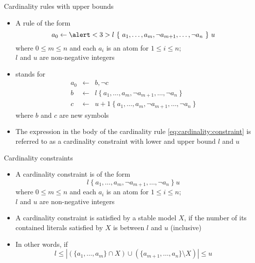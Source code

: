 \begin{frame}{Cardinality rules with upper bounds}
  \begin{itemize}
  \item A rule of the form
    \begin{equation}\label{eq:cardinality:constraint}
      a_0\leftarrow \alert<3>{l~\{\ a_1,\dots,a_m,\neg a_{m+1},\dots,\neg a_n\ \}~u}
    \end{equation}
    where $0\leq m\leq n$ and each $a_i$ is an atom for $1\leq i\leq n$;\\
    $l$ and $u$ are non-negative integers
  \item<2-> []
    stands for
    \[
    \begin{array}{rcl}
      a_0 &\leftarrow& b, \neg c\\
      b   &\leftarrow& l~\{\ a_1,\dots,a_m,\neg a_{m+1},\dots,\neg a_n\ \}\\
      c   &\leftarrow& u{+}1~\{\ a_1,\dots,a_m,\neg a_{m+1},\dots,\neg a_n\ \}
    \end{array}
    \]
    where $b$ and $c$ are new symbols
    \medskip
  \item<3-> 
    The expression in the body of the cardinality rule \eqref{eq:cardinality:constraint} is
    referred to as a \alert<3>{cardinality constraint} with lower and upper bound $l$ and $u$
  \end{itemize}
\end{frame}
\begin{frame}{Cardinality constraints}
  \begin{itemize}
  \item {} A \alert{cardinality constraint} is of the form
    \[
    l~\{\ a_1,\dots,a_m,\neg a_{m+1},\dots,\neg a_n\ \}~u
    \]
    where $0\leq m\leq n$ and each $a_i$ is an atom for $1\leq i\leq n$;\\
    $l$ and $u$ are non-negative integers
    \smallskip
  \item<2->  A cardinality constraint is satisfied by a stable model $X$,
    if the number of its contained literals satisfied by $X$ is between $l$ and $u$ (inclusive)
  \item<3->
    In other words, if
    \[
    l\leq|\left(\{a_1,\dots,a_m\}\cap X\right)\cup\left(\{a_{m+1},\dots,a_n\}\setminus X\right)|\leq u
    \]
  \end{itemize}
\end{frame}

